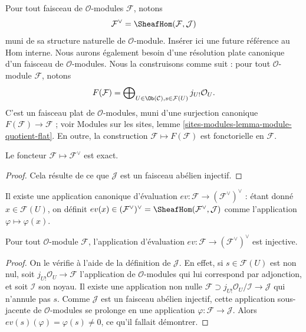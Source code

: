 \medskip\noindent
Pour tout faisceau de $\mathcal{O}$-modules $\mathcal{F}$, notons
$$
\mathcal{F}^\vee
=
\SheafHom(\mathcal{F}, \mathcal{J})
$$
muni de sa structure naturelle de $\mathcal{O}$-module.
Insérer ici une future référence au Hom interne.
Nous aurons également besoin d'une résolution plate canonique d'un faisceau de
$\mathcal{O}$-modules. Nous la construisons comme suit : pour tout
$\mathcal{O}$-module $\mathcal{F}$, notons
$$
F(\mathcal{F})
=
\bigoplus\nolimits_{U \in \Ob(\mathcal{C}), s \in \mathcal{F}(U)}
j_{U!}\mathcal{O}_U.
$$
C'est un faisceau plat de $\mathcal{O}$-modules, muni d'une surjection canonique
$F(\mathcal{F}) \to \mathcal{F}$ ; voir
Modules sur les sites, lemme \ref{sites-modules-lemma-module-quotient-flat}.
En outre, la construction $\mathcal{F} \mapsto F(\mathcal{F})$ est
fonctorielle en $\mathcal{F}$.

\begin{lemma}
\label{lemma-vee-exact-sheaves}
Le foncteur $\mathcal{F} \mapsto \mathcal{F}^\vee$ est exact.
\end{lemma}

\begin{proof}
Cela résulte de ce que $\mathcal{J}$ est un faisceau abélien injectif.
\end{proof}

\noindent
Il existe une application canonique d'évaluation
$ev : \mathcal{F} \to (\mathcal{F}^\vee)^\vee$ : étant donné
$x \in \mathcal{F}(U)$, on définit
$ev(x) \in (\mathcal{F}^\vee)^\vee =
\SheafHom(\mathcal{F}^\vee, \mathcal{J})$ comme l'application
$\varphi \mapsto \varphi(x)$.

\begin{lemma}
\label{lemma-ev-injective-sheaves}
Pour tout $\mathcal{O}$-module $\mathcal{F}$, l'application d'évaluation
$ev : \mathcal{F} \to (\mathcal{F}^\vee)^\vee$ est injective.
\end{lemma}

\begin{proof}
On le vérifie à l'aide de la définition de $\mathcal{J}$. En effet, si
$s \in \mathcal{F}(U)$ est non nul, soit
$j_{U!}\mathcal{O}_U \to \mathcal{F}$ l'application de
$\mathcal{O}$-modules qui lui correspond par adjonction, et soit
$\mathcal{I}$ son noyau. Il existe une application non nulle
$\mathcal{F} \supset j_{U!}\mathcal{O}_U/\mathcal{I} \to \mathcal{J}$ qui
n'annule pas $s$. Comme $\mathcal{J}$ est un faisceau abélien injectif, cette
application sous-jacente de $\mathcal{O}$-modules se prolonge en une application
$\varphi : \mathcal{F} \to \mathcal{J}$.
Alors $ev(s)(\varphi) = \varphi(s) \not = 0$, ce qu'il fallait démontrer.
\end{proof}


